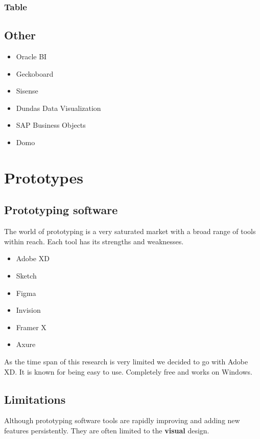         \subsubsection{Table}
        
        \subsection{Other}
        \begin{itemize}
            \item{Oracle BI}
            \item{Geckoboard}
            \item{Sisense}
            \item{Dundas Data Visualization}
            \item{SAP Business Objects}
            \item{Domo}
        \end{itemize}
        
    \section{Prototypes}
        \subsection{Prototyping software}
        The world of prototyping is a very saturated market with a broad range of tools within reach. Each tool has its strengths and weaknesses. 
    
        \begin{itemize}
            \item {Adobe XD}
            \item {Sketch}
            \item {Figma}
            \item {Invision}
            \item {Framer X}
            \item {Axure}
        \end{itemize}
   
        As the time span of this research is very limited we decided to go with Adobe XD. It is known for being easy to use. Completely free and works on Windows. 
    
    \subsection{Limitations} 
    Although prototyping software tools are rapidly improving and adding new features persistently. They are often limited to the \textbf{visual} design.
   
